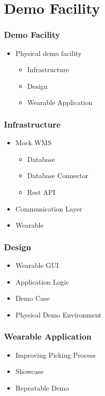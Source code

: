 \section{Demo Facility}
\begin{frame}\frametitle{Demo Facility}
	\begin{itemize}
		\item Physical demo facility
		\begin{itemize}
			\item Infrastructure
			\item Design
			\item Wearable Application
		\end{itemize}
	\end{itemize}
\end{frame}
\begin{frame}\frametitle{Infrastructure}
\begin{itemize}
	\item Mock WMS
	\begin{itemize}
		\item Database
		\item Database Connector
		\item Rest API
	\end{itemize}
	\item Communication Layer
	\item Wearable	
\end{itemize}
\end{frame}
\begin{frame}\frametitle{Design}
	\begin{itemize}
		\item Wearable GUI
		\item Application Logic
		\item Demo Case
		\item Physical Demo Environment
	\end{itemize}
\end{frame}
\begin{frame}\frametitle{Wearable Application}
	\begin{itemize}
		\item Improving Picking Process
		\item Showcase
		\item Repeatable Demo
	\end{itemize}
\end{frame}